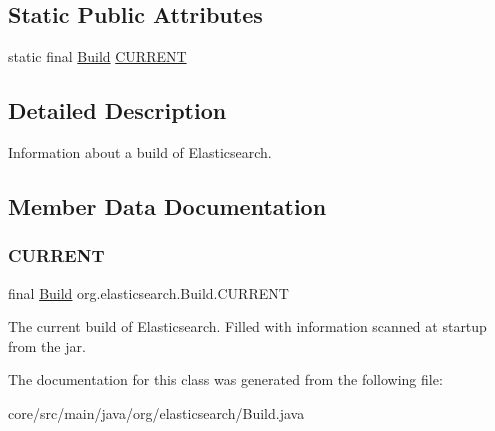 \subsection*{Static Public Attributes}
\begin{DoxyCompactItemize}
\item 
static final \hyperlink{classorg_1_1elasticsearch_1_1_build}{Build} \hyperlink{classorg_1_1elasticsearch_1_1_build_a480d1a0be372a4a9609d59fdc864679f}{C\+U\+R\+R\+E\+NT}
\end{DoxyCompactItemize}


\subsection{Detailed Description}
Information about a build of Elasticsearch. 

\subsection{Member Data Documentation}
\hypertarget{classorg_1_1elasticsearch_1_1_build_a480d1a0be372a4a9609d59fdc864679f}{}\label{classorg_1_1elasticsearch_1_1_build_a480d1a0be372a4a9609d59fdc864679f} 
\subsubsection{\texorpdfstring{C\+U\+R\+R\+E\+NT}{CURRENT}}
{\footnotesize\ttfamily final \hyperlink{classorg_1_1elasticsearch_1_1_build}{Build} org.\+elasticsearch.\+Build.\+C\+U\+R\+R\+E\+NT\hspace{0.3cm}{\ttfamily [static]}}

The current build of Elasticsearch. Filled with information scanned at startup from the jar. 

The documentation for this class was generated from the following file\+:\begin{DoxyCompactItemize}
\item 
core/src/main/java/org/elasticsearch/Build.\+java\end{DoxyCompactItemize}
